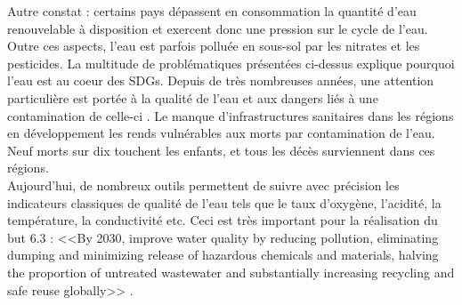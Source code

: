 \documentclass[10pt, article]{llncs}
\begin{document}
			Autre constat : certains pays dépassent en consommation la quantité d'eau renouvelable à disposition et exercent donc une pression sur le cycle de l'eau. \\
			Outre ces aspects, l'eau est parfois polluée en sous-sol par les nitrates et les pesticides\cite{giroux_contamination_1991}.
			La multitude de problématiques présentées ci-dessus explique pourquoi l'eau est au coeur des SDGs. Depuis de très nombreuses années, une attention particulière est portée à la qualité de l'eau et aux dangers liés à une contamination de celle-ci \cite{ashbolt_microbial_2004}. Le manque d'infrastructures sanitaires dans les régions en développement les rends vulnérables aux morts par contamination de l'eau. Neuf morts sur dix touchent les enfants, et tous les décès surviennent dans ces régions. \\
			Aujourd'hui, de nombreux outils permettent de suivre avec précision les indicateurs classiques de qualité de l'eau tels que le taux d'oxygène, l'acidité, la température, la conductivité etc. Ceci est très important pour la réalisation du but 6.3 : <<By 2030, improve water quality by reducing pollution, eliminating dumping and minimizing release of hazardous chemicals and materials, halving the proportion of untreated wastewater and substantially increasing recycling and safe reuse globally>> \cite{united_nations_goal_nodate-4}. \\
		
\end{document}
